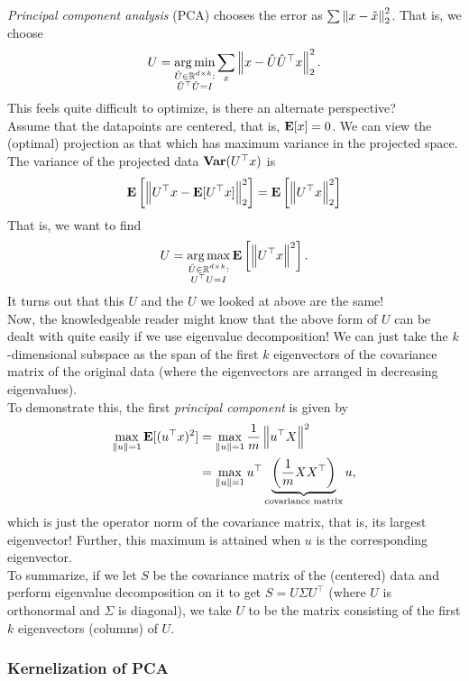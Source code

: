\documentclass{article}
\begin{document}
			\emph{Principal component analysis} (PCA) chooses the error as $\sum \left\lVert x - \tilde{x}\right\rVert_2^2$. That is, we choose
			\[ U = \operatorname*{arg\,min}_{\substack{\hat{U} \in \mathbb{R}^{d\times k} : \\ \hat{U}^\top\hat{U} = I}} \sum_x \left\lVert x - \hat{U}\hat{U}^\top x \right\rVert_2^2. \]
			This feels quite difficult to optimize, is there an alternate perspective?\\
			Assume that the datapoints are centered, that is, $\textbf{E}[x] = 0$. We can view the (optimal) projection as that which has maximum variance in the projected space. The variance of the projected data $\operatorname{\textbf{Var}}(U^\top x)$ is
			\[ \textbf{E}\left[\left\lVert U^\top x - \textbf{E}[U^\top x] \right\rVert_2^2\right] = \textbf{E}\left[\left\lVert U^\top x\right\rVert_2^2\right] \]
			That is, we want to find
			\[ U = \operatorname*{arg\,max}_{\substack{\hat{U} \in \mathbb{R}^{d\times k} : \\ U^\top U = I}} \textbf{E}\left[\left\lVert U^\top x\right\rVert^2\right]. \]
			It turns out that this $U$ and the $U$ we looked at above are the same!\\

			Now, the knowledgeable reader might know that the above form of $U$ can be dealt with quite easily if we use eigenvalue decomposition! We can just take the $k$-dimensional subspace  as the span of the first $k$ eigenvectors of the covariance matrix of the original data (where the eigenvectors are arranged in decreasing eigenvalues).\\
			To demonstrate this, the first \emph{principal component} is given by
			\begin{align*}
				\max_{\left\lVert u\right\rVert = 1} \textbf{E}[(u^\top x)^2] &= \max_{\left\lVert u\right\rVert = 1} \frac{1}{m} \left\lVert u^\top X\right\rVert^2 \\
					&= \max_{\left\lVert u\right\rVert = 1} u^\top \underbrace{\left( \frac{1}{m} X X^\top \right)}_{\text{covariance matrix}} u,
			\end{align*}
			which is just the operator norm of the covariance matrix, that is, its largest eigenvector! Further, this maximum is attained when $u$ is the corresponding eigenvector.\\

			To summarize, if we let $S$ be the covariance matrix of the (centered) data and perform eigenvalue decomposition on it to get $S = U \Sigma U^\top$ (where $U$ is orthonormal and $\Sigma$ is diagonal), we take $U$ to be the matrix consisting of the first $k$ eigenvectors (columns) of $U$. 

		\subsubsection{Kernelization of PCA}
\end{document}
